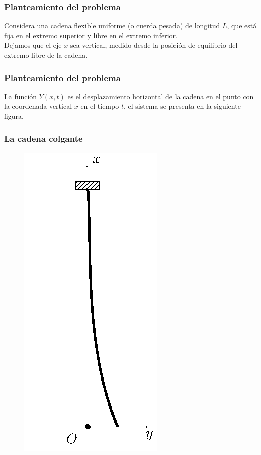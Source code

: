 \documentclass[12pt]{beamer}
\begin{document}
\begin{frame}
\frametitle{Planteamiento del problema}
Considera una cadena flexible uniforme (o cuerda pesada) de longitud $L$, que está fija en el extremo superior y libre en el extremo inferior.
\\
\bigskip
\pause
Dejamos que el eje $x$ sea vertical, medido desde la posición de equilibrio del extremo libre de la cadena.
\end{frame}
\begin{frame}
\frametitle{Planteamiento del problema}
La función $Y (x, t)$ es el desplazamiento horizontal de la cadena en el punto con la coordenada vertical $x$ en el tiempo $t$, el sistema se presenta en la siguiente figura.
\end{frame}
\begin{frame}
\frametitle{La cadena colgante}
\begin{figure}[H]
    \centering
    \includegraphics[scale=0.8]{Imagenes/Cadena_Oscilante_01.eps}
\end{figure}
\end{frame}
\end{document}
